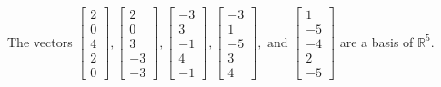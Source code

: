 \begin{exercise}
\begin{exerciseStatement}
  \end{exerciseStatement}
  \begin{exerciseAnswer}
   The vectors \(\left[\begin{array}{r}
2 \\
0 \\
4 \\
2 \\
0
\end{array}\right] , \left[\begin{array}{r}
2 \\
0 \\
3 \\
-3 \\
-3
\end{array}\right] , \left[\begin{array}{r}
-3 \\
3 \\
-1 \\
4 \\
-1
\end{array}\right] , \left[\begin{array}{r}
-3 \\
1 \\
-5 \\
3 \\
4
\end{array}\right] , \text{ and } \left[\begin{array}{r}
1 \\
-5 \\
-4 \\
2 \\
-5
\end{array}\right]\) 
  	 are  a basis of \(\mathbb{R}^5\).
  


  \end{exerciseAnswer}
\end{exercise}